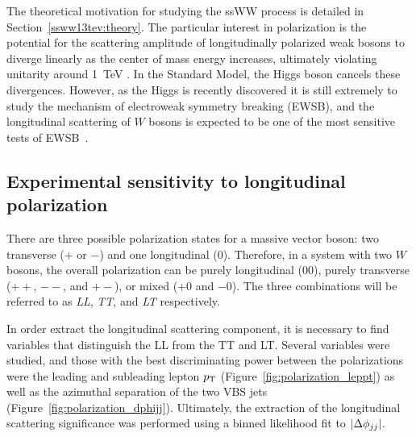 The theoretical motivation for studying the ssWW process is detailed in Section~\ref{ssww13tev:theory}.
The particular interest in polarization is the potential for the scattering amplitude of longitudinally polarized weak bosons to diverge linearly as the center of mass energy increases, ultimately violating unitarity around 1~TeV \cite{1977.ben-lee-weak-interactions}.
In the Standard Model, the Higgs boson cancels these divergences.
However, as the Higgs is recently discovered it is still extremely to study the mechanism of electroweak symmetry breaking (EWSB), and the longitudinal scattering of $W$ bosons is expected to be one of the most sensitive tests of EWSB~\cite{2013.longitudinal-theory}.


\subsection{Experimental sensitivity to longitudinal polarization}\label{sec:sswwupgrade_longitudinal_sens}
There are three possible polarization states for a massive vector boson: two transverse ($+$ or $-$) and one longitudinal ($0$).
Therefore, in a system with two $W$ bosons, the overall polarization can be purely longitudinal ($00$), purely transverse ($++$, $--$, and $+-$), or mixed ($+0$ and $-0$).
The three combinations will be referred to as \emph{LL}, \emph{TT}, and \emph{LT} respectively.

In order extract the longitudinal scattering component, it is necessary to find variables that distinguish the LL from the TT and LT.
Several variables were studied, and those with the best discriminating power between the polarizations were the leading and subleading lepton $p_{\mathrm{T}}$ (Figure~\ref{fig:polarization_leppt}) as well as the azimuthal separation of the two VBS jets (Figure~\ref{fig:polarization_dphijj}).
Ultimately, the extraction of the longitudinal scattering significance was performed using a binned likelihood fit to $|\Delta\phi_{jj}|$.

